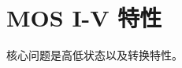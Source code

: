 \documentclass[cn,11pt,chinese,black,simple]{../elegantbook}
\begin{document}
\fi 
\def\chapname{05mosiv}

\chapter{MOS I-V 特性}

核心问题是高低状态以及转换特性。


\let\chapname\undefined
\ifx\mainclass\undefined
\end{document}
